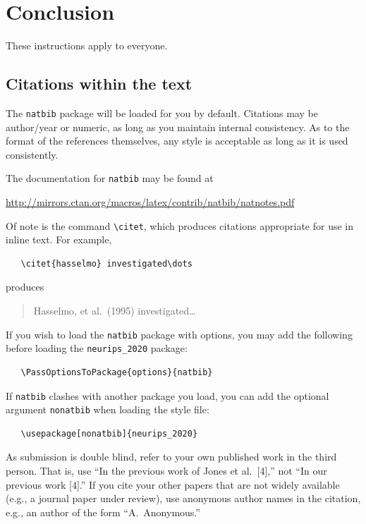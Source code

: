 \documentclass{article}
\begin{document}
\section{Conclusion}
\label{others}

These instructions apply to everyone.

\subsection{Citations within the text}

The \verb+natbib+ package will be loaded for you by default.  Citations may be
author/year or numeric, as long as you maintain internal consistency.  As to the
format of the references themselves, any style is acceptable as long as it is
used consistently.

The documentation for \verb+natbib+ may be found at
\begin{center}
  \url{http://mirrors.ctan.org/macros/latex/contrib/natbib/natnotes.pdf}
\end{center}
Of note is the command \verb+\citet+, which produces citations appropriate for
use in inline text.  For example,
\begin{verbatim}
   \citet{hasselmo} investigated\dots
\end{verbatim}
produces
\begin{quote}
  Hasselmo, et al.\ (1995) investigated\dots
\end{quote}

If you wish to load the \verb+natbib+ package with options, you may add the
following before loading the \verb+neurips_2020+ package:
\begin{verbatim}
   \PassOptionsToPackage{options}{natbib}
\end{verbatim}

If \verb+natbib+ clashes with another package you load, you can add the optional
argument \verb+nonatbib+ when loading the style file:
\begin{verbatim}
   \usepackage[nonatbib]{neurips_2020}
\end{verbatim}

As submission is double blind, refer to your own published work in the third
person. That is, use ``In the previous work of Jones et al.\ [4],'' not ``In our
previous work [4].'' If you cite your other papers that are not widely available
(e.g., a journal paper under review), use anonymous author names in the
citation, e.g., an author of the form ``A.\ Anonymous.''
\end{document}
